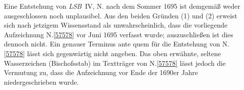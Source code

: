 Eine Entstehung von \textit{LSB}~IV, N.\cite{02509} nach dem Sommer 1695 ist demgemäß weder ausgeschlossen noch unplausibel.
\pend%
\pstart%
Aus den beiden Gründen (1) und (2) erweist sich nach jetzigem Wissensstand als unwahrscheinlich, dass die vorliegende Aufzeichnung N.\;\ref{57578} vor Juni 1695 verfasst wurde; auszuschließen ist dies dennoch nicht.
Ein genauer Terminus ante quem für die Entstehung von N.\;\ref{57578} lässt sich gegenwärtig nicht angeben.
Das oben erwähnte, seltene Wasserzeichen (Bischofsstab) im Textträger von N.\;\ref{57578} lässt jedoch die Vermutung zu, dass die Aufzeichnung vor Ende der 1690er Jahre niedergeschrieben wurde.
\pend%
%
\frenchspacing%
\normalsize%
\newpage%
